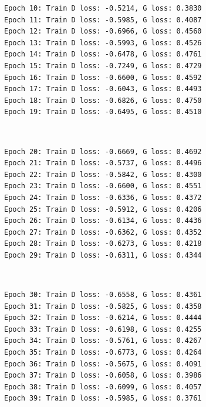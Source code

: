 \documentclass[11pt]{article}
\begin{document}
    \begin{Verbatim}[commandchars=\\\{\}]
Epoch 10: Train D loss: -0.5214, G loss: 0.3830
Epoch 11: Train D loss: -0.5985, G loss: 0.4087
Epoch 12: Train D loss: -0.6966, G loss: 0.4560
Epoch 13: Train D loss: -0.5993, G loss: 0.4526
Epoch 14: Train D loss: -0.6478, G loss: 0.4761
Epoch 15: Train D loss: -0.7249, G loss: 0.4729
Epoch 16: Train D loss: -0.6600, G loss: 0.4592
Epoch 17: Train D loss: -0.6043, G loss: 0.4493
Epoch 18: Train D loss: -0.6826, G loss: 0.4750
Epoch 19: Train D loss: -0.6495, G loss: 0.4510

    \end{Verbatim}

    \begin{center}
    \end{center}
    { \hspace*{\fill} \\}
    
    \begin{Verbatim}[commandchars=\\\{\}]
Epoch 20: Train D loss: -0.6669, G loss: 0.4692
Epoch 21: Train D loss: -0.5737, G loss: 0.4496
Epoch 22: Train D loss: -0.5842, G loss: 0.4300
Epoch 23: Train D loss: -0.6600, G loss: 0.4551
Epoch 24: Train D loss: -0.6336, G loss: 0.4372
Epoch 25: Train D loss: -0.5912, G loss: 0.4206
Epoch 26: Train D loss: -0.6134, G loss: 0.4436
Epoch 27: Train D loss: -0.6362, G loss: 0.4352
Epoch 28: Train D loss: -0.6273, G loss: 0.4218
Epoch 29: Train D loss: -0.6311, G loss: 0.4344

    \end{Verbatim}

    \begin{center}
    \end{center}
    { \hspace*{\fill} \\}
    
    \begin{Verbatim}[commandchars=\\\{\}]
Epoch 30: Train D loss: -0.6558, G loss: 0.4361
Epoch 31: Train D loss: -0.5825, G loss: 0.4358
Epoch 32: Train D loss: -0.6214, G loss: 0.4444
Epoch 33: Train D loss: -0.6198, G loss: 0.4255
Epoch 34: Train D loss: -0.5761, G loss: 0.4267
Epoch 35: Train D loss: -0.6773, G loss: 0.4264
Epoch 36: Train D loss: -0.5675, G loss: 0.4091
Epoch 37: Train D loss: -0.6058, G loss: 0.3986
Epoch 38: Train D loss: -0.6099, G loss: 0.4057
Epoch 39: Train D loss: -0.5985, G loss: 0.3761

    \end{Verbatim}
\end{document}
